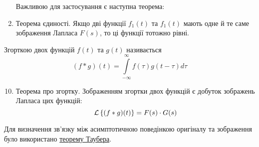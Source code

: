 \begin{enumerate}[label=\arabic*.]
\hspace*{\dimexpr\linewidth-\textwidth\relax} Важливою для застосування є наступна теорема:

		\item Теорема єдиності. Якщо дві функції $f_1(t)$ та $f_1(t)$ мають одне й те саме зображення Лапласа $F(s)$, то ці функції тотожно рівні.
\end{enumerate}
\begin{defin}
Згорткою двох функцій $f(t)$ та $g(t)$ називається
	\begin{equation}
		(f*g)(t) = \int\limits_{-\infty}^{\infty} f(\tau) g(t - \tau) d\tau
	\end{equation}
\end{defin}
\begin{enumerate}[label=\arabic*.]
	\setcounter{enumi}{9}
	\item Теорема про згортку. Зображенням згортки двох функцій є добуток зображень Лапласа цих функцій:
		\begin{equation}
			\mathcal{L}\left\{(f*g)(t)\right\} = F(s) \cdot G(s)
		\end{equation}
\end{enumerate}
Для визначення зв’язку між асимптотичною поведінкою оригіналу та зображення було використано \hyperref[eq:tauber_thm]{теорему Таубера}.
